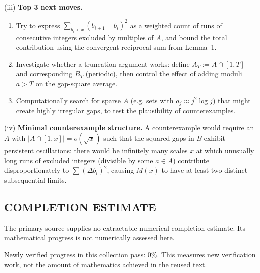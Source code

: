 (iii) \textbf{Top 3 next moves.}
\begin{enumerate}
\item Try to express $\sum_{b_i<x}(b_{i+1}-b_i)^2$ as a weighted count of runs of consecutive integers excluded by multiples of $A$, and bound the total contribution using the convergent reciprocal sum from Lemma~1.
\item Investigate whether a truncation argument works: define $A_T:=A\cap[1,T]$ and corresponding $B_T$ (periodic), then control the effect of adding moduli $a>T$ on the gap-square average.
\item Computationally search for sparse $A$ (e.g. sets with $a_j\approx j^2 \log j$) that might create highly irregular gaps, to test the plausibility of counterexamples.
\end{enumerate}

(iv) \textbf{Minimal counterexample structure.} A counterexample would require an $A$ with $|A\cap[1,x]|=o(\sqrt x)$ such that the squared gaps in $B$ exhibit persistent oscillations: there would be infinitely many scales $x$ at which unusually long runs of excluded integers (divisible by some $a\in A$) contribute disproportionately to $\sum (\Delta b_i)^2$, causing $M(x)$ to have at least two distinct subsequential limits.

\bigskip



\subsection*{COMPLETION ESTIMATE}
The primary source supplies no extractable numerical completion estimate. Its mathematical progress is not numerically assessed here.

Newly verified progress in this collection pass: $0\%$. This measures new verification work, not the amount of mathematics achieved in the reused text.
